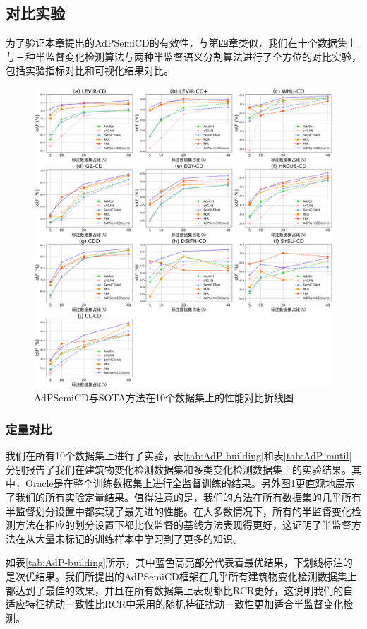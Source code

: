 \documentclass[lang=chs, degree=master, blindreview=false, adobe=false]{yanputhesis}
\begin{document}
\subsection{对比实验}
为了验证本章提出的AdPSemiCD的有效性，与第四章类似，我们在十个数据集上与三种半监督变化检测算法与两种半监督语义分割算法进行了全方位的对比实验，包括实验指标对比和可视化结果对比。
\begin{figure}[H]
  \centering
  \includegraphics[scale=0.30]{images/AdPvis_plot.png}
  \caption{
    AdPSemiCD与SOTA方法在10个数据集上的性能对比折线图
  }
  \label{fig:AdPiou_plot}
\end{figure}
\subsubsection{定量对比}
我们在所有10个数据集上进行了实验，表\ref{tab:AdP-building}和表\ref{tab:AdP-mutil}分别报告了我们在建筑物变化检测数据集和多类变化检测数据集上的实验结果。其中，Oracle是在整个训练数据集上进行全监督训练的结果。另外图\ref{fig:AdPiou_plot}更直观地展示了我们的所有实验定量结果。值得注意的是，我们的方法在所有数据集的几乎所有半监督划分设置中都实现了最先进的性能。在大多数情况下，所有的半监督变化检测方法在相应的划分设置下都比仅监督的基线方法表现得更好，这证明了半监督方法在从大量未标记的训练样本中学习到了更多的知识。

如表\ref{tab:AdP-building}所示，其中蓝色高亮部分代表着最优结果，下划线标注的是次优结果。我们所提出的AdPSemiCD框架在几乎所有建筑物变化检测数据集上都达到了最佳的效果，并且在所有数据集上表现都比RCR更好，这说明我们的自适应特征扰动一致性比RCR中采用的随机特征扰动一致性更加适合半监督变化检测。
\end{document}
